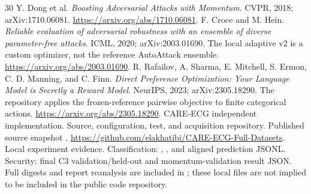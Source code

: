 \begin{thebibliography}{30}
 Y. Dong et al. \emph{Boosting Adversarial Attacks with Momentum}. CVPR, 2018; arXiv:1710.06081. \url{https://arxiv.org/abs/1710.06081}.
 F. Croce and M. Hein. \emph{Reliable evaluation of adversarial robustness with an ensemble of diverse parameter-free attacks}. ICML, 2020; arXiv:2003.01690. The local adaptive v2 is a custom optimizer, not the reference AutoAttack ensemble. \url{https://arxiv.org/abs/2003.01690}.
 R. Rafailov, A. Sharma, E. Mitchell, S. Ermon, C. D. Manning, and C. Finn. \emph{Direct Preference Optimization: Your Language Model is Secretly a Reward Model}. NeurIPS, 2023; arXiv:2305.18290. The repository applies the frozen-reference pairwise objective to finite categorical actions. \url{https://arxiv.org/abs/2305.18290}.
 CARE-ECG independent implementation. Source, configuration, test, and acquisition repository. Published source snapshot . \url{https://github.com/elakhatibi/CARE-ECG-Full-Datasets}.
 Local experiment evidence. Classification: , , and aligned prediction JSONL. Security: final C3 validation/held-out and momentum-validation result JSON. Full digests and report reanalysis are included in ; these local files are not implied to be included in the public code repository.
\end{thebibliography}
